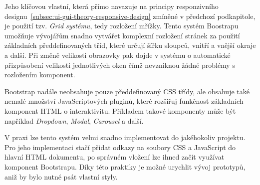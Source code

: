 Jeho klíčovou vlastní, která přímo navazuje na principy responzivního designu~\ref{subsec:ui-gui-theory-responsive-design} zmíněné v předchozí podkapitole, je použití tzv. \textit{Grid systému}, tedy rozložení mřížky. Tento systém Boostrapu umožňuje vývojářům snadno vytvářet komplexní rozložení stránek za použití základních předdefinovaných tříd, které určují šířku sloupců, vnitří a vnější okraje a další. Při změně velikosti obrazovky pak dojde v systému o automatické přizpůsobení velikosti jednotlivých oken čímž nevzniknou žádné problémy s rozložením komponent.

Bootstrap nadále neobsahuje pouze předdefinovaný CSS třídy, ale obsahuje také nemalé množství JavaScriptových pluginů, které rozšiřuj funkčnost základních komponent HTML o interaktivitu. Příkladem takové komponenty může být například \textit{Dropdown}, \textit{Modal}, \textit{Carousel} a další.

V praxi lze tento systém velmi snadno implementovat do jakéhokoliv projektu. Pro jeho implementaci stačí přidat odkazy na soubory CSS a JavaScript do hlavní HTML dokumentu, po správném vložení lze ihned začít využívat komponent Bootstrapu. Díky této praktiky je možné urychlit vývoj prototypů, aniž by bylo nutné psát vlastní styly.

\endinput